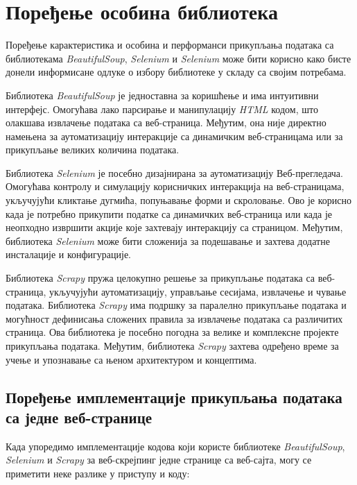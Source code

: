 \documentclass[12pt,oneside]{memoir}
\begin{document}
\chapter{Поређење особина библиотека}
\label{chp:poredjenje}
Поређење карактеристика и особина и перформанси прикупљања података са библиотекама \textit{BeautifulSoup}, \textit{Selenium} и \textit{Selenium} може бити корисно како бисте донели информисане одлуке о избору библиотеке у складу са својим потребама.

Библиотека \textit{BeautifulSoup} је једноставна за коришћење и има интуитивни интерфејс. Омогућава лако парсирање и манипулацију \textit{HTML} кодом, што олакшава извлачење података са веб-страница. Међутим, она није директно намењена за аутоматизацију интеракције са динамичким веб-страницама или за прикупљање великих количина података.

Библиотека \textit{Selenium} је посебно дизајнирана за аутоматизацију Веб-прегледача. Омогућава контролу и симулацију корисничких интеракција на веб-страницама, укључујући кликтање дугмића, попуњавање форми и скроловање. Ово је корисно када је потребно прикупити податке са динамичких веб-страница или када је неопходно извршити акције које захтевају интеракцију са страницом. Међутим, библиотека \textit{Selenium} може бити сложенија за подешавање и захтева додатне инсталације и конфигурације.

Библиотека \textit{Scrapy} пружа целокупно решење за прикупљање података са веб-страница, укључујући аутоматизацију, управљање сесијама, извлачење и чување података. Библиотека \textit{Scrapy} има подршку за паралелно прикупљање података и могућност дефинисања сложених правила за извлачење података са различитих страница. Ова библиотека је посебно погодна за велике и комплексне пројекте прикупљања података. Међутим, библиотека \textit{Scrapy} захтева одређено време за учење и упознавање са њеном архитектуром и концептима.

\section{Поређење имплементације прикупљања података са једне веб-странице}
Када упоредимо имплементације кодова који користе библиотеке \textit{BeautifulSoup}, \textit{Selenium} и \textit{Scrapy} за веб-скрејпинг једне странице са веб-сајта, могу се приметити неке разлике у приступу и коду:
\end{document}
